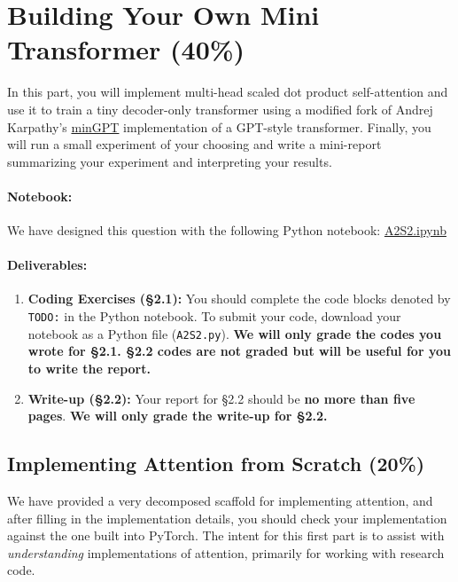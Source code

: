 \documentclass{article}
\begin{document}
\newpage

\section{Building Your Own Mini Transformer (40\%)}

In this part, you will implement multi-head scaled dot product self-attention
and use it to train a tiny decoder-only transformer using a modified fork of
Andrej Karpathy's \href{https://github.com/karpathy/minGPT}{minGPT}
implementation of a GPT-style transformer. Finally, you will run a small
experiment of your choosing and write a mini-report summarizing your experiment
and interpreting your results.

\paragraph{Notebook:}
We have designed this question with the following Python notebook:
\textcolor{blue}{\href{https://colab.research.google.com/drive/1slSlIuxm6qYiHQH5PrcbpmzHvHuW5vF5?usp=sharing}{A2S2.ipynb}}


\paragraph{Deliverables:} 

\begin{enumerate}
\item \textbf{Coding Exercises (\S 2.1):} You should complete the code blocks
denoted by \texttt{TODO:} in the Python notebook. To submit your code, download
your notebook as a Python file (\verb|A2S2.py|). \textbf{We will only grade the
codes you wrote for \S 2.1. \S 2.2 codes are not graded but will be useful for
you to write the report.}
\item \textbf{Write-up (\S 2.2):} Your report for \S 2.2 should be \textbf{no
more than five pages}. \textbf{We will only grade the write-up for \S 2.2.}
\end{enumerate}


\subsection{Implementing Attention from Scratch (20\%)}

We have provided a very decomposed scaffold for implementing attention, and
after filling in the implementation details, you should check your
implementation against the one built into PyTorch. The intent for this first
part is to assist with \textit{understanding} implementations of attention,
primarily for working with research code. 
\end{document}
